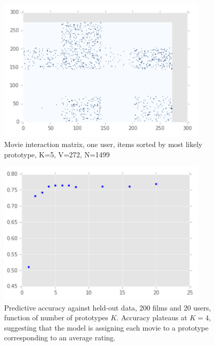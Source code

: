 \begin{figure}
\centering
\includegraphics[width=10cm]{images/interactions_movie}
\caption{Movie interaction matrix, one user, items sorted by most likely prototype, K=5, V=272, N=1499}
\label{fig:interactions_movie} 
\end{figure}

\begin{figure}
\centering
\includegraphics[width=10cm]{images/acc_movies}
\caption{Predictive accuracy against held-out data, 200 films and 20 users, function of number of prototypes $K$. Accuracy plateaus at $K = 4$, suggesting that the model is assigning each movie to a prototype corresponding to an average rating.}
\label{fig:acc_movies} 
\end{figure}


